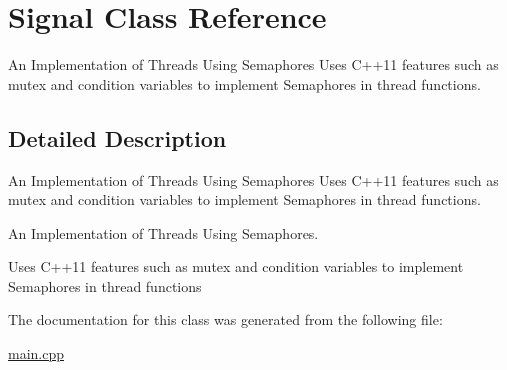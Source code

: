 \hypertarget{class_signal}{}\section{Signal Class Reference}
\label{class_signal}


An Implementation of Threads Using Semaphores Uses C++11 features such as mutex and condition variables to implement Semaphores in thread functions.  




\subsection{Detailed Description}
An Implementation of Threads Using Semaphores Uses C++11 features such as mutex and condition variables to implement Semaphores in thread functions. 

An Implementation of Threads Using Semaphores.

Uses C++11 features such as mutex and condition variables to implement Semaphores in thread functions 

The documentation for this class was generated from the following file\+:\begin{DoxyCompactItemize}
\item 
\hyperlink{main_8cpp}{main.\+cpp}\end{DoxyCompactItemize}
